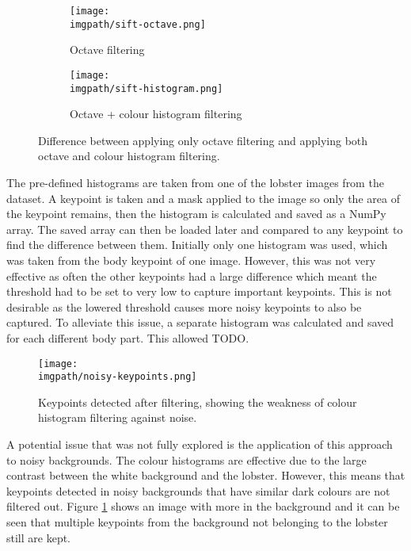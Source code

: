 \begin{figure}[H]
	\begin{subfigure}{0.5\textwidth}
	\texttt{[image: \\imgpath/sift-octave.png]}
	\caption{Octave filtering}
	\end{subfigure}
	\hspace*{\fill}
	\begin{subfigure}{0.5\textwidth}
	\texttt{[image: \\imgpath/sift-histogram.png]}
	\caption{Octave + colour histogram filtering}
	\end{subfigure}
\caption{Difference between applying only octave filtering and applying both octave and colour histogram filtering.}
\end{figure}
\noindent
The pre-defined histograms are taken from one of the lobster images from the dataset. A keypoint is taken and a mask applied to the image so only the area of the keypoint remains, then the histogram is calculated and saved as a NumPy array. The saved array can then be loaded later and compared to any keypoint to find the difference between them. Initially only one histogram was used, which was taken from the body keypoint of one image. However, this was not very effective as often the other keypoints had a large difference which meant the threshold had to be set to very low to capture important keypoints. This is not desirable as the lowered threshold causes more noisy keypoints to also be captured. To alleviate this issue, a separate histogram was calculated and saved for each different body part. This allowed TODO.
\begin{figure}[H]
\centering
\texttt{[image: \\imgpath/noisy-keypoints.png]}
\caption{Keypoints detected after filtering, showing the weakness of colour histogram filtering against noise.}
\label{fig:noisy-histogram}
\end{figure}
\noindent
A potential issue that was not fully explored is the application of this approach to noisy backgrounds. The colour histograms are effective due to the large contrast between the white background and the lobster. However, this means that keypoints detected in noisy backgrounds that have similar dark colours are not filtered out. Figure \ref{fig:noisy-histogram} shows an image with more in the background and it can be seen that multiple keypoints from the background not belonging to the lobster still are kept.


